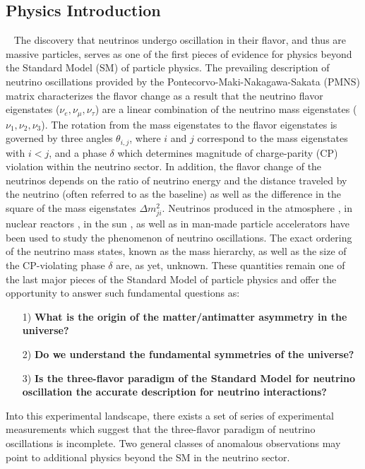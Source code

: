 \subsection{Physics Introduction}~\label{ss:if-physics}
The discovery that neutrinos undergo oscillation in their flavor, and thus are massive particles, serves as one of the first pieces of evidence for physics beyond the Standard Model (SM) of particle physics. The prevailing description of neutrino oscillations provided by the Pontecorvo-Maki-Nakagawa-Sakata (PMNS) matrix characterizes the flavor change as a result that the neutrino flavor eigenstates ($\nu_{e}, \nu_{\mu}, \nu_{\tau}$) are a linear combination of the neutrino mass eigenstates ($\nu_{1}, \nu_{2}, \nu_{3}$). The rotation from the mass eigenstates to the flavor eigenstates is governed by three angles $\theta_{i,j}$, where $i$ and $j$ correspond to the mass eigenstates with $i < j$, and a phase $\delta$ which determines magnitude of charge-parity (CP) violation within the neutrino sector. In addition, the flavor change of the neutrinos depends on the ratio of neutrino energy and the distance traveled by the neutrino (often referred to as the baseline) as well as the difference in the square of the mass eigenstates $\Delta m_{ji}^{2}$. Neutrinos produced in the atmosphere \cite{No1, No2, No3}, in nuclear reactors \cite{No4, No5, No6}, in the sun \cite{No7, No8, No9}, as well as in man-made particle accelerators \cite{No10, No11, No12} have been used to study the phenomenon of neutrino oscillations. The exact ordering of the neutrino mass states, known as the mass hierarchy, as well as the size of the CP-violating phase $\delta$ are, as yet, unknown. These quantities remain one of the last major pieces of the Standard Model of particle physics and offer the opportunity to answer such fundamental questions as:

\begin{itemize}
\item[1)] \textbf{What is the origin of the matter/antimatter asymmetry in the universe?}

\item[2)] \textbf{Do we understand the fundamental symmetries of the universe?}

\item[3)] \textbf{Is the three-flavor paradigm of the Standard Model for neutrino oscillation the accurate description for neutrino interactions?}
\end{itemize}

Into this experimental landscape, there exists a set of series of experimental measurements which suggest that the three-flavor paradigm of neutrino oscillations is incomplete. Two general classes of anomalous observations may point to additional physics beyond the SM  in the neutrino sector.

